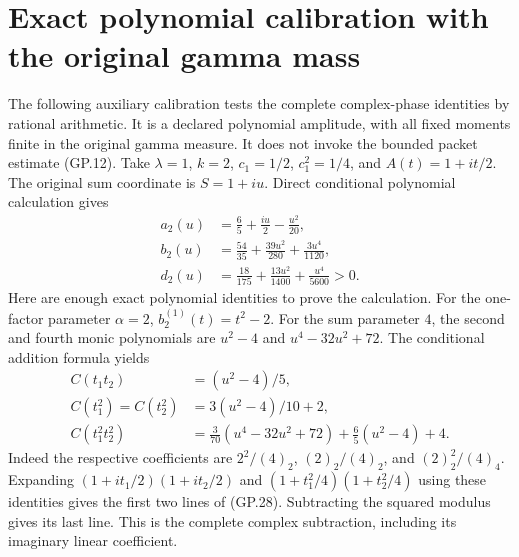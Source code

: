 \documentclass[11pt]{article}
\begin{document}
\section{Exact polynomial calibration with the original gamma mass}
The following auxiliary calibration tests the complete complex-phase
identities by rational arithmetic. It is a declared polynomial amplitude,
with all fixed moments finite in the original gamma measure. It does not
invoke the bounded packet estimate (GP.12). Take $\lambda=1$, $k=2$,
$c_1=1/2$, $c_1^2=1/4$, and $A(t)=1+it/2$. The original sum coordinate
is $S=1+iu$. Direct conditional polynomial calculation gives
\begin{equation}
 \begin{aligned}
 a_2(u)&=\frac65+\frac{iu}{2}-\frac{u^2}{20},\\
 b_2(u)&=\frac{54}{35}+\frac{39u^2}{280}+\frac{3u^4}{1120},\\
 d_2(u)&=\frac{18}{175}+\frac{13u^2}{1400}+\frac{u^4}{5600}>0.
 \end{aligned}
 \tag{GP.28}
\end{equation}
Here are enough exact polynomial identities to prove the calculation.
For the one-factor parameter $\alpha=2$, $b_2^{(1)}(t)=t^2-2$.
For the sum parameter $4$, the second and fourth monic polynomials are
$u^2-4$ and $u^4-32u^2+72$. The conditional addition formula yields
\begin{align*}
 C(t_1t_2)&=(u^2-4)/5,\\
 C(t_1^2)=C(t_2^2)&=3(u^2-4)/10+2,\\
 C(t_1^2t_2^2)&=\frac3{70}(u^4-32u^2+72)
                        +\frac65(u^2-4)+4.
\end{align*}
Indeed the respective coefficients are
$2^2/(4)_2$, $(2)_2/(4)_2$, and $(2)_2^2/(4)_4$.
Expanding $(1+it_1/2)(1+it_2/2)$ and
$(1+t_1^2/4)(1+t_2^2/4)$ using these identities gives the first two
lines of (GP.28). Subtracting the squared modulus gives its last line.
This is the complete complex subtraction, including its imaginary
linear coefficient.
\end{document}

